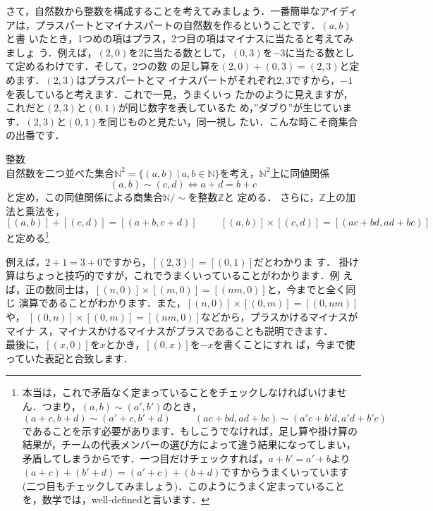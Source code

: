 
さて，自然数から整数を構成することを考えてみましょう．一番簡単なアイディ
アは，プラスパートとマイナスパートの自然数を作るということです．$(a,b)$と書
いたとき，1つめの項はプラス，2つ目の項はマイナスに当たると考えてみましょ
う．例えば，$(2,0)$を$2$に当たる数として，$(0,3)$を$-3$に当たる数として定めるわけです．そして，2つの数
の足し算を$(2,0)+(0,3)=(2,3)$と定めます．$(2,3)$はプラスパートとマ
イナスパートがそれぞれ$2,3$ですから，$-1$を表していると考えます．これで一見，うまくいっ
たかのように見えますが，これだと$(2,3)$と$(0,1)$が同じ数字を表しているた
め，”ダブり”が生じています．$(2,3)$と$(0,1)$を同じものと見たい，同一視し
たい．こんな時こそ商集合の出番です．


\begin{defi} 整数 \\
 自然数を二つ並べた集合$\mathbb{N}^2=\{(a,b)\ |\ a,b\in
\mathbb{N}\}$を考え，$\mathbb{N}^2$上に同値関係
\[
 (a,b)\sim(c,d)\Leftrightarrow a+d=b+c
\]
と定め，この同値関係による商集合$\mathbb{N}/\sim$を整数$\mathbb{Z}$と
 定める．
 さらに，$\mathbb{Z}$上の加法と乗法を，
 \[
  [(a,b)]+[(c,d)]=[(a+b,c+d)]\hspace{1cm}[(a,b)]\times[(c,d)]=[(ac+bd,ad+bc)]
 \]
 と定める\footnote{本当は，これで矛盾なく定まっていることをチェックしなければいけません．つまり，$(a,b)\sim(a',b')$のとき，\[(a+c,b+d)\sim(a'+c,b'+d)\hspace{1cm}(ac+bd,ad+bc)\sim(a'c+b'd,a'd+b'c)\]であることを示す必要があります．もしこうでなければ，足し算や掛け算の結果が，チームの代表メンバーの選び方によって違う結果になってしまい，矛盾してしまうからです．一つ目だけチェックすれば，$a+b'=a'+b$より$(a+c)+(b'+d)=(a'+c)+(b+d)$ですからうまくいっています(二つ目もチェックしてみましょう)．このようにうまく定まっていることを，数学では，well-definedと言います．}
\end{defi}

例えば，$2+1=3+0$ですから，$[(2,3)]=[(0,1)]$だとわかりま
す．
掛け算はちょっと技巧的ですが，これでうまくいっていることがわかります．例
えば，正の数同士は，$[(n,0)]\times[(m,0)]=[(nm,0)] $と，今までと全く同じ
演算であることがわかります．また，$[(n,0)]\times[(0,m)]=[(0,nm)]$や，
$[(0,n)]\times[(0,m)]=[(nm,0)]$などから，プラスかけるマイナスがマイナ
ス，マイナスかけるマイナスがプラスであることも説明できます．\\
最後に，$[(x,0)]$を$x$とかき，$[(0,x)]$を$-x$を書くことにすれ
ば，今まで使っていた表記と合致します．



